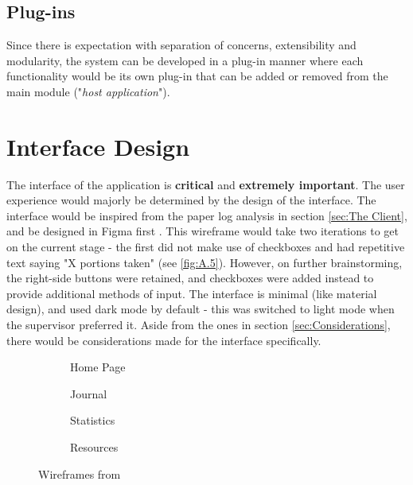 \documentclass[../main.tex]{subfiles}
\begin{document}
\subsection{Plug-ins}

Since there is expectation with separation of concerns, extensibility and modularity, the system can be developed in a plug-in manner where each functionality would be its own plug-in that can be added or removed from the main module ("\textit{host application}").

\section{Interface Design}

The interface of the application is \textbf{critical} and \textbf{extremely important}. The user experience would majorly be determined by the design of the interface. The interface would be inspired from the paper log analysis in section \ref{sec:The Client}, and be designed in Figma \cite{FigmaPortionMate} first \cite{wikiWireframes}. This wireframe would take two iterations to get on the current stage - the first did not make use of checkboxes and had repetitive text saying "X portions taken" (see \ref{fig:A.5}). However, on further brainstorming, the right-side buttons were retained, and checkboxes were added instead to provide additional methods of input. The interface is minimal (like material design), and used dark mode by default - this was switched to light mode when the supervisor preferred it. Aside from the ones in section \ref{sec:Considerations}, there would be considerations made for the interface specifically.

\begin{figure}
    \centering
    \noindent\begin{subfigure}{.24\textwidth}
    \centering
    \caption{Home Page}
    \end{subfigure}\hfill
    \begin{subfigure}{.24\textwidth}
    \centering
    \caption{Journal}
    \end{subfigure}\hfill
    \begin{subfigure}{.24\textwidth}
    \centering
    \caption{Statistics}
    \end{subfigure}\hfill
    \begin{subfigure}{.24\textwidth}
    \centering
    \caption{Resources}
    \end{subfigure}
    \caption{Wireframes from }%
\end{figure}
\end{document}
